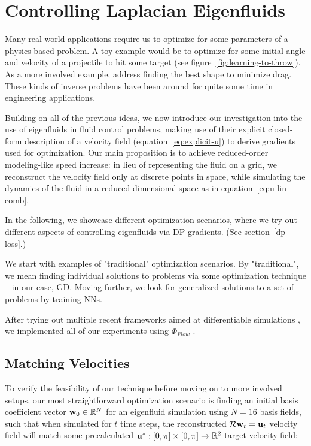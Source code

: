\chapter{Controlling Laplacian Eigenfluids}
\label{chapter:controlling-laplacian-eigenfluids}
Many real world applications require us to optimize for some parameters of
a physics-based problem. A toy example would be to optimize for some initial
angle and velocity of a projectile to hit some target (see
figure~\ref{fig:learning-to-throw}). As a more involved example, \citet{MinDrag}
address finding the best shape to minimize drag. These kinds of inverse problems
have been around for quite some time in engineering applications.

Building on all of the previous ideas, we now introduce our investigation into
the use of eigenfluids in fluid control problems, making use of their explicit
closed-form description of a velocity field (equation~\eqref{eq:explicit-u}) to
derive gradients used for optimization. Our main proposition is to achieve
reduced-order modeling-like speed increase: in lieu of representing the fluid on
a grid, we reconstruct the velocity field only at discrete points in space,
while simulating the dynamics of the fluid in a reduced dimensional
space as in equation~\eqref{eq:u-lin-comb}.

In the following, we showcase different optimization scenarios, where we try out
different aspects of controlling eigenfluids via \acf{DP} gradients. (See
section~\ref{dp-loss}.)

We start with examples of "traditional" optimization scenarios. By
"traditional", we mean finding individual solutions to problems via some
optimization technique -- in our case, \acf{GD}. Moving further, we look for
generalized solutions to a set of problems by training \acfp{NN}.

After trying out multiple recent frameworks aimed at differentiable simulations
\cite{warp2022,difftaichi}, we implemented all of our experiments
using $\Phi_{Flow}$ \cite{holl2019pdecontrol}.

\section{Matching Velocities}\label{section:matching-velocities}
To verify the feasibility of our technique before moving on to more involved
setups, our most straightforward optimization scenario is finding an initial
basis coefficient vector $\vb{w}_0 \in \mathbb{R}^N$ for an eigenfluid
simulation using $N=16$ basis fields, such that when simulated for $t$ time
steps, the reconstructed $\mathcal{R}\vb{w}_t = \vb{u}_t$ velocity
field will match some precalculated $\vb{u}^*: [0,\pi]\times[0,\pi] \to
\mathbb{R}^2$ target velocity field:

